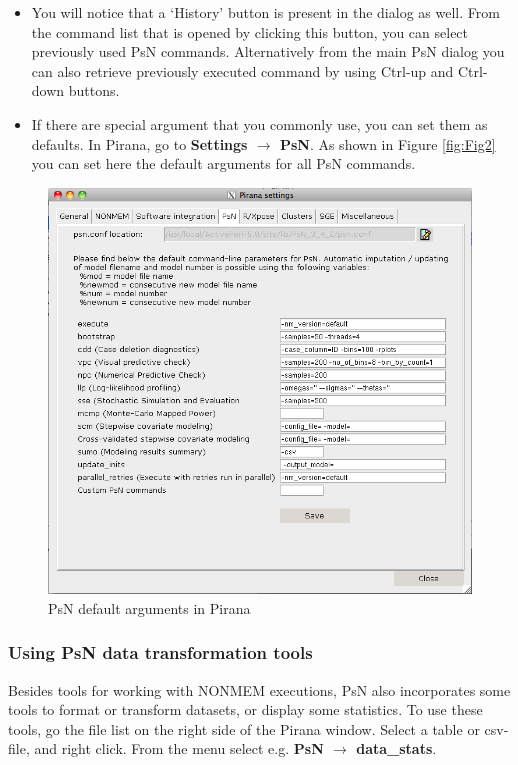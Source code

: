 \begin{itemize}
\item You will notice that a `History' button is present in the dialog as
well. From the command list that is opened by clicking this button,
you can select previously used PsN commands. Alternatively from the
main PsN dialog you can also retrieve previously executed command by
using Ctrl-up and Ctrl-down buttons.

\item If there are special argument that you commonly use, you can set
  them as defaults. In Pirana, go to \textbf{Settings $\rightarrow$
    PsN}. As shown in Figure \ref{fig:Fig2} you can set here the default
  arguments for all PsN commands.

\end{itemize}
\begin{figure}[h] \centering
  \includegraphics[scale=.4]{images/psn_defaults.png}
  \caption{PsN default arguments in Pirana\label{fig:Fig4}}
\end{figure}

\subsubsection*{Using PsN data transformation tools}
Besides tools for working with NONMEM executions, PsN also
incorporates some tools to format or transform datasets, or display
some statistics. To use these tools, go the file list on the right
side of the Pirana window. Select a table or csv-file, and right
click. From the menu select e.g. \textbf{PsN $\rightarrow$ data\_stats}.

